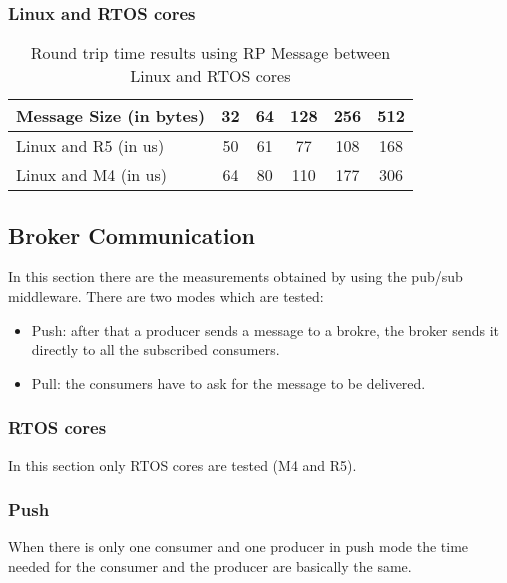 \subsubsection{Linux and RTOS cores}

\begin{table}
\centering
\caption{Round trip time results using RP Message between Linux and RTOS cores}
\label{table:direct_communication_linux_RTOS_cores}
\begin{tabular}{lccccc}
\toprule
Message Size (in bytes) & 32 & 64 & 128 & 256 & 512 \\
\midrule
Linux and R5 (in us) & 50 & 61 & 77 & 108 & 168 \\
Linux and M4 (in us) & 64 & 80 & 110 & 177 & 306 \\
\bottomrule
\end{tabular}
\end{table}

\subsection{Broker Communication}

In this section there are the measurements obtained by using the pub/sub
middleware. There are two modes which are tested:

\begin{itemize}
    \item   Push: after that a producer sends a message to a brokre, the broker
            sends it directly to all the subscribed consumers.
    \item   Pull: the consumers have to ask for the message to be delivered.
\end{itemize}

\subsubsection{RTOS cores}

In this section only RTOS cores are tested (M4 and R5).

\subsubsection{Push}

When there is only one consumer and one producer in push mode the time needed
for the consumer and the producer are basically the same.

